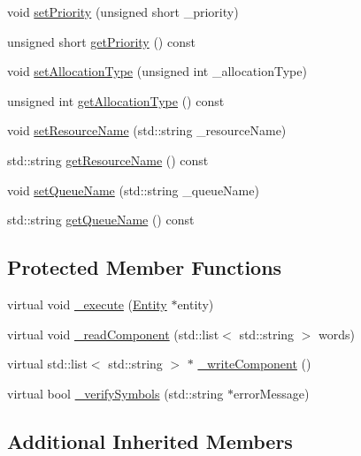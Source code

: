 \begin{DoxyCompactItemize}
\item 
void \hyperlink{class_seize_aa9c7a856ef519696526192a06dab9551}{set\-Priority} (unsigned short \-\_\-priority)
\item 
unsigned short \hyperlink{class_seize_aae382dc1d1d3dc9a3de927cc9d7811c9}{get\-Priority} () const 
\item 
void \hyperlink{class_seize_a4f6354bf4897ce4c46ff9c1e2dd5c150}{set\-Allocation\-Type} (unsigned int \-\_\-allocation\-Type)
\item 
unsigned int \hyperlink{class_seize_ac40f22e56d4448c5d5bae40b64ef4deb}{get\-Allocation\-Type} () const 
\item 
void \hyperlink{class_seize_a2bdaa616c4fd499f754099eb59729547}{set\-Resource\-Name} (std\-::string \-\_\-resource\-Name)
\item 
std\-::string \hyperlink{class_seize_a30781601e8fcfb165c99aee731c081e8}{get\-Resource\-Name} () const 
\item 
void \hyperlink{class_seize_a4d24a3326db05e92439379e1c4efa940}{set\-Queue\-Name} (std\-::string \-\_\-queue\-Name)
\item 
std\-::string \hyperlink{class_seize_a37f2b1a10e1ae390d5186a87bdebe30a}{get\-Queue\-Name} () const 
\end{DoxyCompactItemize}
\subsection*{Protected Member Functions}
\begin{DoxyCompactItemize}
\item 
virtual void \hyperlink{class_seize_a96f6517a40b3bfd0d5ea753d59cef797}{\-\_\-execute} (\hyperlink{class_entity}{Entity} $\ast$entity)
\item 
virtual void \hyperlink{class_seize_a69fe928579655a1bdd550ff368965419}{\-\_\-read\-Component} (std\-::list$<$ std\-::string $>$ words)
\item 
virtual std\-::list$<$ std\-::string $>$ $\ast$ \hyperlink{class_seize_a870a593f82847bce26272e27a66bbc69}{\-\_\-write\-Component} ()
\item 
virtual bool \hyperlink{class_seize_a51dc9257dc692083006f676546ddfff8}{\-\_\-verify\-Symbols} (std\-::string $\ast$error\-Message)
\end{DoxyCompactItemize}
\subsection*{Additional Inherited Members}


